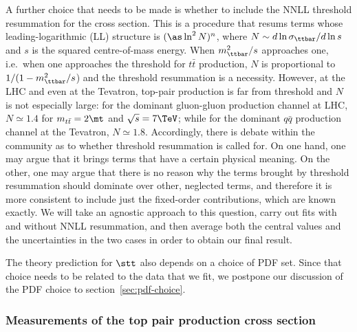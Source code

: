 A further choice that needs to be made is whether to include the NNLL
threshold resummation for the cross section.
%
This is a procedure that resums terms whose leading-logarithmic (LL)
structure is $(\as \ln^2 N)^n$, where $N \sim d\ln\sigma_{\ttbar}/d\ln s$ and
$s$ is the squared centre-of-mass energy.
%
When $m_{\ttbar}^2/s$ approaches one, i.e.\ when one approaches the
threshold for $t\bar t$ production, $N$ is proportional to
$1/(1-m_{\ttbar}^2/s$) and the threshold resummation is a necessity.
%
However, at the LHC and even at the Tevatron, top-pair production is
far from threshold and $N$ is not especially large: for the dominant
gluon-gluon production channel at LHC, $N \simeq 1.4$ for
$m_{t\bar t} = 2 \mt$ and $\sqrt{s} = 7\TeV$; while for the dominant
$q\bar q$ production channel at the Tevatron, $N \simeq 1.8$.
%
Accordingly, there is debate within the community as to
whether threshold resummation is called for.
%
On one hand, one may argue that it brings terms that have a certain
physical meaning.
%
On the other, one may argue that there is no reason why the terms
brought by threshold resummation should dominate over other, neglected
terms, and therefore it is more consistent to include just the
fixed-order contributions, which are known exactly.
%
We will take an agnostic approach to this question, carry out fits
with and without NNLL resummation, and then average both the central
values and the uncertainties in the two cases in order to obtain our
final result.

The theory prediction for $\stt$ also depends on a choice of PDF set.
%
Since that choice needs to be related to the data that we fit, we
postpone our discussion of the PDF choice to
section~\ref{sec:pdf-choice}.


\subsubsection{Measurements of the top pair production cross section}
\label{sec:data}

